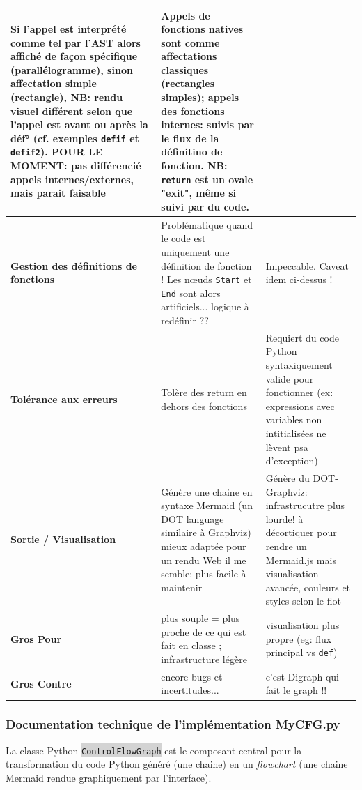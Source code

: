 \documentclass[11pt,a4paper]{article}
\newcommand{\code}[1]{\colorbox{lightgray}{\texttt{\small #1}}}
\begin{document}
\begin{longtable}{|p{3cm}|p{7cm}|p{6cm}|}
Si l'appel est interprété comme tel par l'AST alors affiché de façon spécifique (parallélogramme), sinon affectation simple (rectangle), NB: rendu visuel différent selon que l'appel est avant ou après la déf° (cf. exemples \texttt{defif} et \texttt{defif2}). POUR LE MOMENT: pas différencié appels internes/externes, mais parait faisable & 
Appels de fonctions natives sont comme affectations classiques (rectangles simples); appels des fonctions internes: suivis par le flux de la définitino de fonction. NB: \texttt{return} est un ovale "exit", même si suivi par du code. \\
\hline
\textbf{Gestion des définitions de fonctions} & 
Problématique quand le code est uniquement une définition de fonction ! Les nœuds \texttt{Start} et \texttt{End} sont alors artificiels... logique à redéfinir ??  & 
Impeccable. Caveat idem ci-dessus ! \\
\hline
\textbf{Tolérance aux erreurs} & 
Tolère des return en dehors des fonctions & 
Requiert du code Python syntaxiquement valide pour fonctionner (ex: expressions avec variables non intitialisées ne lèvent psa d'exception) \\
\hline
\textbf{Sortie / Visualisation} & 
Génère une chaine en syntaxe Mermaid (un DOT language similaire à Graphviz) mieux adaptée pour un rendu Web il me semble: plus facile à maintenir & 
Génère du DOT-Graphviz: infrastrucutre plus lourde! à décortiquer pour rendre un Mermaid.js mais visualisation avancée, couleurs et styles selon le flot \\
\hline
\textbf{Gros Pour} & 
plus souple = plus proche de ce qui est fait en classe ; infrastructure légère & 
visualisation plus propre (eg: flux principal vs \texttt{def})  \\
\hline
\textbf{Gros Contre} & 
encore bugs et incertitudes... & 
c'est Digraph qui fait le graph !! \\
\hline
\end{longtable}

\subsubsection{Documentation technique de l'implémentation MyCFG.py}
La classe Python \code{ControlFlowGraph} est le composant central pour la transformation du code Python généré (une chaine) en un \textit{flowchart} (une chaine Mermaid rendue graphiquement par l'interface).
\end{document}
